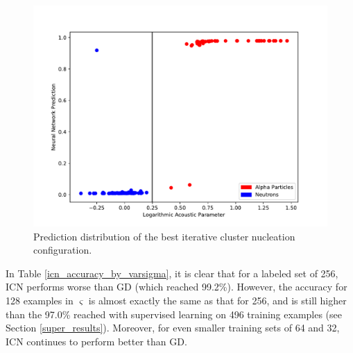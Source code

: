\documentclass[10pt]{article}
\begin{document}
\begin{figure}[h]
    \centering
    \includegraphics[width=\textwidth]{icn_grid_search}
    \caption{\label{icn_grid_search} Prediction distribution of the best iterative cluster nucleation configuration.}
\end{figure}

In Table \ref{icn_accuracy_by_varsigma}, it is clear that for a labeled set of 256, ICN performs worse than GD (which reached 99.2\%). However, the accuracy for 128 examples in $\varsigma$ is almost exactly the same as that for 256, and is still higher than the 97.0\% reached with supervised learning on 496 training examples (see Section \ref{super_results}). Moreover, for even smaller training sets of 64 and 32, ICN continues to perform better than GD.
\end{document}

